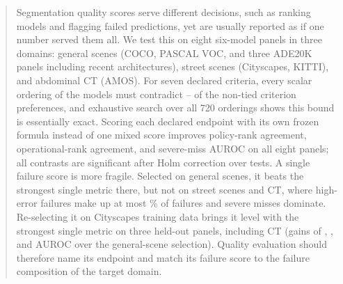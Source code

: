 \begin{abstract}
Segmentation quality scores serve different decisions, such as ranking models
and flagging failed predictions, yet are usually reported as if one number
served them all. We test this on eight six-model panels in three domains:
general scenes (COCO, PASCAL VOC, and three ADE20K panels including recent
architectures), street scenes (Cityscapes, KITTI), and abdominal CT (AMOS). For
seven declared criteria, every scalar ordering of the models must contradict
\NBAllMin{}--\NBAllMax{} of the non-tied criterion preferences, and exhaustive
search over all 720 orderings shows this bound is essentially exact. Scoring
each declared endpoint with its own frozen formula instead of one mixed score
improves policy-rank agreement, operational-rank agreement, and severe-miss
AUROC on all eight panels; all \NNontrivialSig{} contrasts are significant after
Holm correction over \NFamilyN{} tests. A single failure score is more fragile.
Selected on general scenes, it beats the strongest single metric there, but not
on street scenes and CT, where high-error failures make up at most
\NMaxShareLose\% of failures and severe misses dominate. Re-selecting it on
Cityscapes training data brings it level with the strongest single metric on
three held-out panels, including CT (gains of \NSelGainCity, \NSelGainKitti, and
\NSelGainAmos{} AUROC over the general-scene selection). Quality
evaluation should therefore name its endpoint and match its failure score to
the failure composition of the target domain.
\end{abstract}
